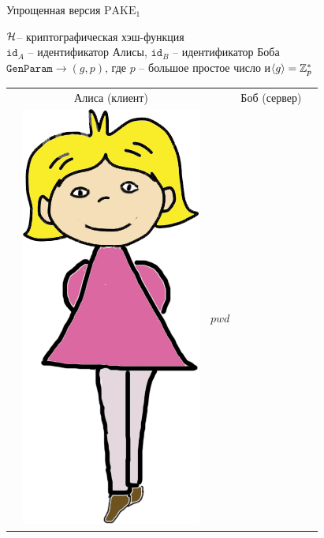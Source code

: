 \documentclass[usenames,dvipsnames,8pt,aspectratio=169]{beamer}
\begin{document}
\begin{frame}{Упрощенная версия $\text{PAKE}_1$}
\Large
\vspace{-20pt}
\begin{center}
	$\mathcal{H}$-- криптографическая хэш-функция \\[2pt]
	$\mathtt{id}_{A}$ -- идентификатор Алисы, $\mathtt{id}_{B}$ -- идентификатор Боба\\[2pt]
	$\mathtt{GenParam} \rightarrow (g, p)$, где $p$ -- большое простое число и$\langle g \rangle = {{\mathbb Z}}_p^\ast$
	\large 
	\begin{center}
		\begin{tabular}{l c c c l}
			& Алиса (клиент)  & & Боб (сервер) &  \\
			& \multirow{2}{*}{\includegraphics[scale=0.15]{Alice}} & {\huge $pwd$} &  \hspace{-20pt}

\end{tabular}
\end{center}
\end{center}
\end{frame}
\end{document}

